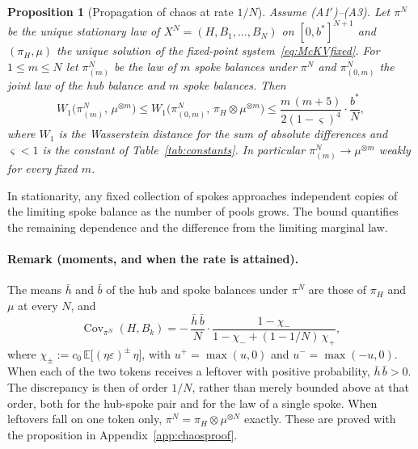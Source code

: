 \documentclass[11pt,a4paper]{article}
\theoremstyle{siphon}
\newtheorem{proposition}{Proposition}
\begin{document}
\begin{proposition}[Propagation of chaos at rate $1/N$]\label{thm:chaos2A}
Assume (A1$'$)--(A3). Let $\pi^N$ be the unique stationary law of $X^N = (H, B_1, \ldots, B_N)$ on $[0, b^*]^{N+1}$ and $(\pi_H, \mu)$ the unique solution of the fixed-point system~\eqref{eq:McKVfixed}. For $1 \leq m \leq N$ let $\pi^N_{(m)}$ be the law of $m$ spoke balances under $\pi^N$ and $\pi^N_{(0,m)}$ the joint law of the hub balance and $m$ spoke balances. Then
\[
W_1\bigl(\pi^N_{(m)},\,\mu^{\otimes m}\bigr)  \leq  W_1\bigl(\pi^N_{(0,m)},\,\pi_H \otimes \mu^{\otimes m}\bigr)  \leq  \frac{m\,(m + 5)}{2 (1 - \varsigma)^4}\cdot\frac{b^*}{N} ,
\]
where $W_1$ is the Wasserstein distance for the sum of absolute differences and $\varsigma < 1$ is the constant of Table~\ref{tab:constants}. In particular $\pi^N_{(m)} \to \mu^{\otimes m}$ weakly for every fixed $m$.
\end{proposition}

\noindent In stationarity, any fixed collection of spokes approaches independent copies of the limiting spoke balance as the number of pools grows. The bound quantifies the remaining dependence and the difference from the limiting marginal law.

\paragraph{Remark (moments, and when the rate is attained).}
The means $\bar h$ and $\bar b$ of the hub and spoke balances under $\pi^N$ are those of $\pi_H$ and $\mu$ at every $N$, and
\[
\operatorname{Cov}_{\pi^N}(H, B_k)  =  -\,\frac{\bar h\,\bar b}{N}\cdot\frac{1 - \chi_-}{1 - \chi_- + (1 - 1/N)\,\chi_+} ,
\]
where $\chi_\pm := c_0\,\mathbb{E}\bigl[(\eta\varepsilon)^\pm\,\eta\bigr]$, with $u^+ = \max(u, 0)$ and $u^- = \max(-u, 0)$. When each of the two tokens receives a leftover with positive probability, $\bar h\,\bar b > 0$. The discrepancy is then of order $1/N$, rather than merely bounded above at that order, both for the hub-spoke pair and for the law of a single spoke. When leftovers fall on one token only, $\pi^N = \pi_H \otimes \mu^{\otimes N}$ exactly. These are proved with the proposition in Appendix~\ref{app:chaosproof}.
\end{document}
